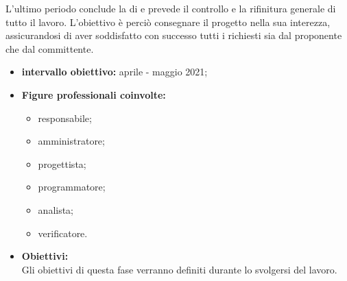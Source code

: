 L'ultimo periodo conclude la  di  e prevede il controllo e la rifinitura generale di tutto il lavoro. L'obiettivo è perciò consegnare il progetto nella sua interezza, assicurandosi di aver soddisfatto con successo tutti i  richiesti sia dal proponente che dal committente.
 \begin{itemize}
         \item \textbf{intervallo obiettivo: } aprile - maggio 2021;
         \item  \textbf{Figure professionali coinvolte:}
         \begin{itemize}
            \item responsabile;
            \item amministratore;
            \item progettista;
            \item programmatore;
            \item analista;
            \item verificatore.
        \end{itemize}
         \item \textbf{Obiettivi:}\\
         Gli obiettivi di questa fase verranno definiti durante lo svolgersi del lavoro. 
 \end{itemize}
